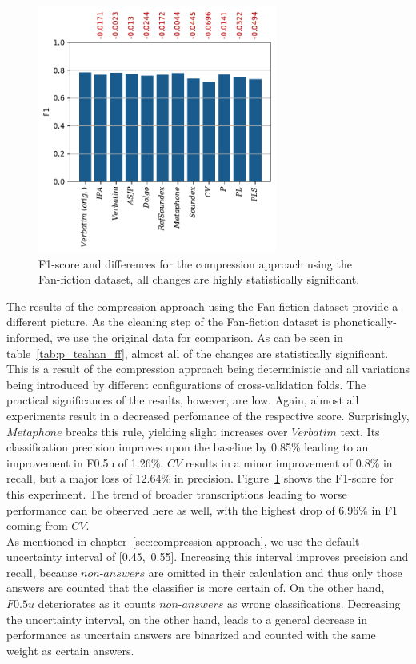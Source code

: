 \begin{figure}
  \centering
  \includegraphics[width=0.7\textwidth]{figures/results_f1_ff_teahan}
  \caption{F1-score and differences for the compression approach using the Fan-fiction dataset, all changes are highly statistically significant.}
  \label{fig:results_f1_ff_teahan}
\end{figure}
The results of the compression approach using the Fan-fiction dataset provide a different picture.
As the cleaning step of the Fan-fiction dataset is phonetically-informed, we use the original data for comparison.
As can be seen in table~\ref{tab:p_teahan_ff}, almost all of the changes are statistically significant.
This is a result of the compression approach being deterministic and all variations being introduced by different configurations of cross-validation folds.
The practical significances of the results, however, are low.
Again, almost all experiments result in a decreased perfomance of the respective score.
Surprisingly, $Metaphone$ breaks this rule, yielding slight increases over $Verbatim$ text.
Its classification precision improves upon the baseline by 0.85\% leading to an improvement in F0.5u of 1.26\%.
$CV$ results in a minor improvement of 0.8\% in recall, but a major loss of 12.64\% in precision.
Figure~\ref{fig:results_f1_ff_teahan} shows the F1-score for this experiment.
The trend of broader transcriptions leading to worse performance can be observed here as well, with the highest drop of 6.96\% in F1 coming from $CV$.\\
As mentioned in chapter~\ref{sec:compression-approach}, we use the default uncertainty interval of [0.45,~0.55].
Increasing this interval improves precision and recall, because $non$-$answers$ are omitted in their calculation and thus only those answers are counted that the classifier is more certain of.
On the other hand, $F0.5u$ deteriorates as it counts $non$-$answers$ as wrong classifications.
Decreasing the uncertainty interval, on the other hand, leads to a general decrease in performance as uncertain answers are binarized and counted with the same weight as certain answers.\\

